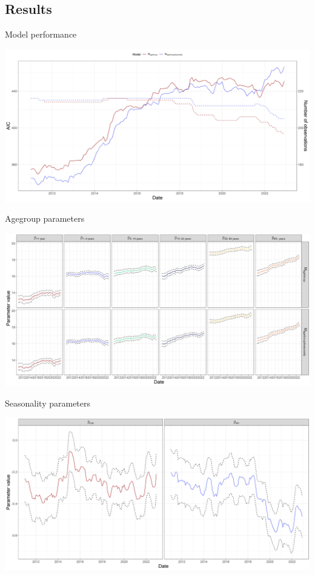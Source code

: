 \documentclass[aspectratio=169]{beamer}
\begin{document}
\hypertarget{results-1}{%
\subsection{Results}\label{results-1}}

\begin{frame}{Model performance}
\protect\hypertarget{model-performance-1}{}
\tiny

\includegraphics[width=1\linewidth]{../figures/AICxSTEC_PoisG}

\normalsize
\end{frame}

\begin{frame}{Agegroup parameters}
\protect\hypertarget{agegroup-parameters-1}{}
\tiny

\includegraphics[width=1\linewidth]{../figures/ageGroupParxSTEC_PoisG}

\normalsize
\end{frame}

\begin{frame}{Seasonality parameters}
\protect\hypertarget{seasonality-parameters-1}{}
\tiny

\includegraphics[width=1\linewidth]{../figures/SeasonalityParxSTEC_PoisG}

\normalsize
\end{frame}
\end{document}
